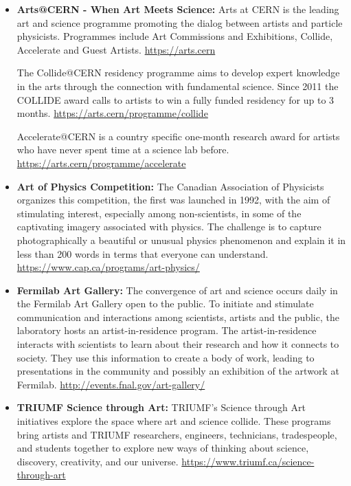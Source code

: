\begin{itemize}
\item
  \textbf{Arts@CERN - When Art Meets Science:} Arts at CERN is the
  leading art and science programme promoting the dialog between artists
  and particle physicists. Programmes include Art Commissions and
  Exhibitions, Collide, Accelerate and Guest Artists.
  \url{https://arts.cern}

  The Collide@CERN residency programme aims to develop expert knowledge
  in the arts through the connection with fundamental science. Since
  2011 the COLLIDE award calls to artists to win a fully funded
  residency for up to 3 months.
  \url{https://arts.cern/programme/collide}

  Accelerate@CERN is a country specific one-month research award for
  artists who have never spent time at a science lab before.
  \url{https://arts.cern/programme/accelerate}
\item
  \textbf{Art of Physics Competition:} The Canadian Association of
  Physicists organizes this competition, the first was launched in 1992,
  with the aim of stimulating interest, especially among non-scientists,
  in some of the captivating imagery associated with physics. The
  challenge is to capture photographically a beautiful or unusual
  physics phenomenon and explain it in less than 200 words in terms that
  everyone can understand.
  \url{https://www.cap.ca/programs/art-physics/}
\item
  \textbf{Fermilab Art Gallery:} The convergence of art and science
  occurs daily in the Fermilab Art Gallery open to the public. To
  initiate and stimulate communication and interactions among
  scientists, artists and the public, the laboratory hosts an
  artist-in-residence program. The artist-in-residence interacts with
  scientists to learn about their research and how it connects to
  society. They use this information to create a body of work, leading
  to presentations in the community and possibly an exhibition of the
  artwork at Fermilab. \url{http://events.fnal.gov/art-gallery/}
\item
  \textbf{TRIUMF Science through Art:} TRIUMF's Science through Art
  initiatives explore the space where art and science collide. These
  programs bring artists and TRIUMF researchers, engineers, technicians,
  tradespeople, and students together to explore new ways of thinking
  about science, discovery, creativity, and our universe.
  \url{https://www.triumf.ca/science-through-art}
\end{itemize}

